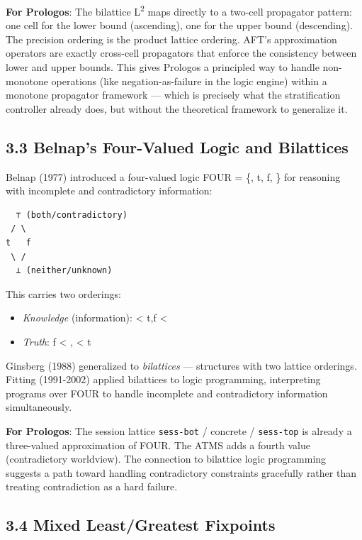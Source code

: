 \documentclass[11pt]{article}
\begin{document}
\textbf{For Prologos}: The bilattice L\textsuperscript{2} maps directly to a two-cell propagator
pattern: one cell for the lower bound (ascending), one for the upper bound
(descending). The precision ordering is the product lattice ordering. AFT's
approximation operators are exactly cross-cell propagators that enforce the
consistency between lower and upper bounds. This gives Prologos a principled
way to handle non-monotone operations (like negation-as-failure in the logic
engine) within a monotone propagator framework --- which is precisely what
the stratification controller already does, but without the theoretical
framework to generalize it.
\subsection{3.3 Belnap's Four-Valued Logic and Bilattices}
\label{sec:org4eca73b}

Belnap (1977) introduced a four-valued logic FOUR = \{\bot, t, f, \top\}
for reasoning with incomplete and contradictory information:

\begin{verbatim}
  ⊤ (both/contradictory)
 / \
t   f
 \ /
  ⊥ (neither/unknown)
\end{verbatim}

This carries two orderings:
\begin{itemize}
\item \emph{Knowledge} (information): \bot < t,f < \top
\item \emph{Truth}: f < \bot, \top < t
\end{itemize}

Ginsberg (1988) generalized to \emph{bilattices} --- structures with two lattice
orderings. Fitting (1991-2002) applied bilattices to logic programming,
interpreting programs over FOUR to handle incomplete and contradictory
information simultaneously.

\textbf{For Prologos}: The session lattice \texttt{sess-bot} / concrete / \texttt{sess-top} is
already a three-valued approximation of FOUR. The ATMS adds a fourth value
(contradictory worldview). The connection to bilattice logic programming
suggests a path toward handling contradictory constraints gracefully rather
than treating contradiction as a hard failure.
\subsection{3.4 Mixed Least/Greatest Fixpoints}
\label{sec:orgb43798b}
\end{document}
